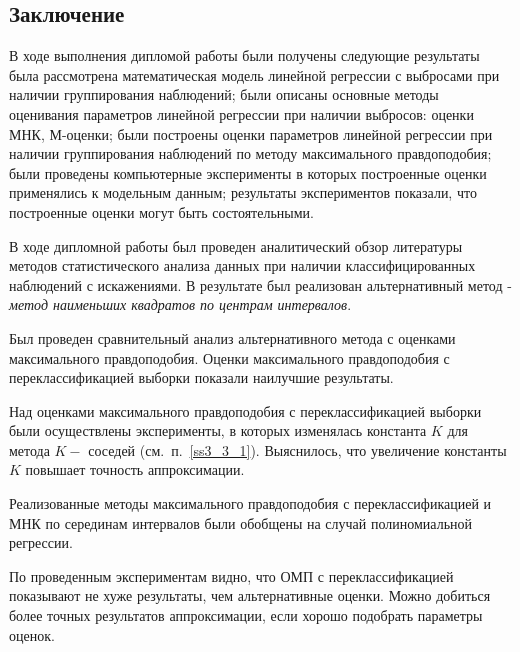 \begin{center}
    \section*{Заключение}
\end{center}
{}
В ходе выполнения дипломой работы были получены следующие результаты была рассмотрена математическая модель линейной регрессии с выбросами при наличии группирования наблюдений; были описаны основные методы оценивания параметров линейной регрессии при наличии выбросов: оценки МНК, М-оценки;
были построены оценки параметров линейной регрессии при наличии группирования наблюдений по методу максимального правдоподобия;
были проведены компьютерные эксперименты в которых построенные оценки применялись к модельным данным;
результаты экспериментов показали, что построенные оценки могут быть состоятельными.

В ходе дипломной работы был проведен аналитический обзор литературы методов статистического анализа данных при наличии классифицированных наблюдений с искажениями.
В результате был реализован альтернативный метод - \textit{метод наименьших квадратов по центрам интервалов}.

Был проведен сравнительный анализ альтернативного метода с оценками максимального правдоподобия. Оценки максимального правдоподобия с переклассификацией выборки показали наилучшие результаты. 

Над оценками максимального правдоподобия с переклассификацией выборки были осуществлены эксперименты, в которых изменялась константа $K$ для метода $K-$ соседей (см.~п.~\ref{ss3_3_1}). Выяснилось, что увеличение константы $K$ повышает точность аппроксимации.

Реализованные методы максимального правдоподобия с переклассификацией и МНК по серединам интервалов  были обобщены на случай полиномиальной регрессии.


По проведенным экспериментам видно, что ОМП с переклассификацией показывают не хуже результаты, чем альтернативные оценки.
Можно добиться более точных результатов аппроксимации, если хорошо подобрать параметры оценок.